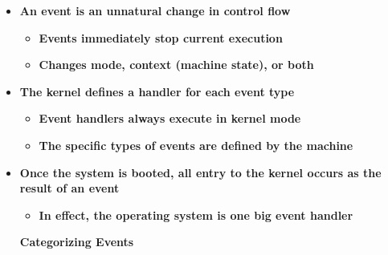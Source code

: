 \documentclass[12pt]{article}
\begin{document}
\begin{itemize}
	\item {\fontsize{16pt}{19.2pt}\selectfont \textbf{An event is an unnatural change in control flow}\par}\par

\begin{itemize}
	\item {\fontsize{16pt}{19.2pt}\selectfont \textbf{Events immediately stop current execution}\par}\par

	\item {\fontsize{16pt}{19.2pt}\selectfont \textbf{Changes mode, context (machine state), or both}\par}
\end{itemize}\par

	\item {\fontsize{16pt}{19.2pt}\selectfont \textbf{The kernel defines a handler for each event type}\par}\par

\begin{itemize}
	\item {\fontsize{16pt}{19.2pt}\selectfont \textbf{Event handlers always execute in kernel mode}\par}\par

	\item {\fontsize{16pt}{19.2pt}\selectfont \textbf{The specific types of events are defined by the machine}\par}
\end{itemize}\par

	\item {\fontsize{16pt}{19.2pt}\selectfont \textbf{Once the system is booted, all entry to the kernel occurs as the result of an event}\par}\par

\begin{itemize}
	\item {\fontsize{16pt}{19.2pt}\selectfont \textbf{In effect, the operating system is one big event handler}\par}
\end{itemize}\par


\vspace{\baselineskip}
\begin{adjustwidth}{0.75in}{0.0in}
{\fontsize{22pt}{26.4pt}\selectfont \textbf{Categorizing Events}\par}\par


\end{adjustwidth}
\end{itemize}
\end{document}
